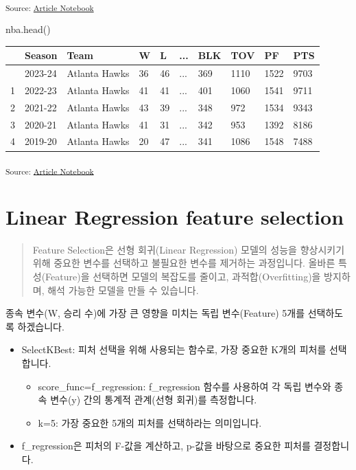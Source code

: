 \documentclass[
  a4paper,
  DIV=11,
  numbers=noendperiod]{scrreprt}
\newenvironment{Shaded}{\begin{snugshade}}{\end{snugshade}}
\newcommand{\NormalTok}[1]{\textcolor[rgb]{0.00,0.23,0.31}{#1}}
\providecommand{\tightlist}{%
  \setlength{\itemsep}{0pt}\setlength{\parskip}{0pt}}\usepackage{longtable,booktabs,array}
\begin{document}
\textsubscript{Source:
\href{https://sigmadream.github.io/practice-quarto/NBA_2023-24.ipynb.html}{Article
Notebook}}

\begin{Shaded}
\begin{Highlighting}[]
\NormalTok{nba.head()}
\end{Highlighting}
\end{Shaded}

\begin{longtable}[]{@{}llllllllll@{}}
\toprule\noalign{}
& Season & Team & W & L & ... & BLK & TOV & PF & PTS \\
\midrule\noalign{}
\endhead
\bottomrule\noalign{}
\endlastfoot
0 & 2023-24 & Atlanta Hawks & 36 & 46 & ... & 369 & 1110 & 1522 &
9703 \\
1 & 2022-23 & Atlanta Hawks & 41 & 41 & ... & 401 & 1060 & 1541 &
9711 \\
2 & 2021-22 & Atlanta Hawks & 43 & 39 & ... & 348 & 972 & 1534 & 9343 \\
3 & 2020-21 & Atlanta Hawks & 41 & 31 & ... & 342 & 953 & 1392 & 8186 \\
4 & 2019-20 & Atlanta Hawks & 20 & 47 & ... & 341 & 1086 & 1548 &
7488 \\
\end{longtable}

\textsubscript{Source:
\href{https://sigmadream.github.io/practice-quarto/NBA_2023-24.ipynb.html}{Article
Notebook}}

\chapter{Linear Regression feature
selection}\label{linear-regression-feature-selection}

\begin{quote}
Feature Selection은 선형 회귀(Linear Regression) 모델의 성능을
향상시키기 위해 중요한 변수를 선택하고 불필요한 변수를 제거하는
과정입니다. 올바른 특성(Feature)을 선택하면 모델의 복잡도를 줄이고,
과적합(Overfitting)을 방지하며, 해석 가능한 모델을 만들 수 있습니다.
\end{quote}

종속 변수(W, 승리 수)에 가장 큰 영향을 미치는 독립 변수(Feature) 5개를
선택하도록 하겠습니다.

\begin{itemize}
\tightlist
\item
  SelectKBest: 피처 선택을 위해 사용되는 함수로, 가장 중요한 K개의
  피처를 선택합니다.

  \begin{itemize}
  \tightlist
  \item
    score\_func=f\_regression: f\_regression 함수를 사용하여 각 독립
    변수와 종속 변수(y) 간의 통계적 관계(선형 회귀)를 측정합니다.
  \item
    k=5: 가장 중요한 5개의 피처를 선택하라는 의미입니다.
  \end{itemize}
\item
  f\_regression은 피처의 F-값을 계산하고, p-값을 바탕으로 중요한 피처를
  결정합니다.
\end{itemize}
\end{document}
